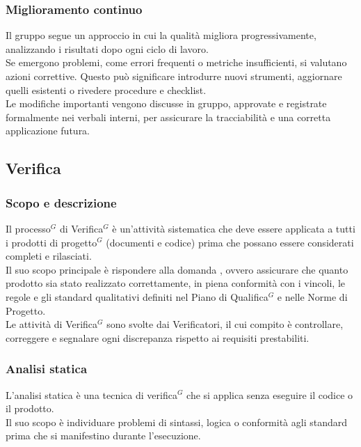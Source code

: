 \subsubsection{Miglioramento continuo}
Il gruppo segue un approccio in cui la qualità migliora progressivamente, analizzando i risultati dopo ogni ciclo di lavoro.\\ 
Se emergono problemi, come errori frequenti o metriche insufficienti, si valutano azioni correttive. Questo può significare introdurre nuovi strumenti, aggiornare quelli esistenti o rivedere procedure e checklist.\\ Le modifiche importanti vengono discusse in gruppo, approvate e registrate formalmente nei verbali interni, per assicurare la tracciabilità e una corretta applicazione futura.

\subsection{Verifica}
\label{sec:verifica}
\subsubsection{Scopo e descrizione}
Il processo$^G$ di Verifica$^G$ è un'attività sistematica che deve essere applicata a tutti i prodotti di progetto$^G$ (documenti e codice) prima che possano essere considerati completi e rilasciati.\\ 
Il suo scopo principale è rispondere alla domanda , ovvero assicurare che quanto prodotto sia stato realizzato correttamente, in piena conformità con i vincoli, le regole e gli standard qualitativi definiti nel Piano di Qualifica$^G$ e nelle Norme di Progetto.\\ 
Le attività di Verifica$^G$ sono svolte dai Verificatori, il cui compito è controllare, correggere e segnalare ogni discrepanza rispetto ai requisiti prestabiliti.

\subsubsection{Analisi statica}
L'analisi statica è una tecnica di verifica$^G$ che si applica senza eseguire il codice o il prodotto.\\
Il suo scopo è individuare problemi di sintassi, logica o conformità agli standard prima che si manifestino durante l'esecuzione.\\

